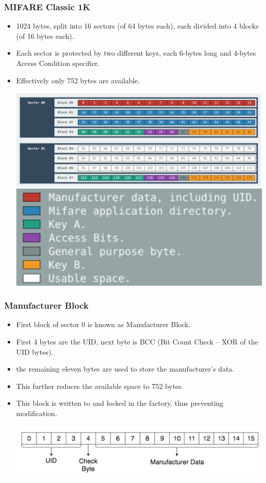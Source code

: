 \documentclass[12pt]{beamer}
\begin{document}
\begin{frame}
\frametitle{MIFARE Classic 1K}
\begin{itemize}
	\item 1024 bytes, split into 16 sectors (of 64 bytes each), each divided into 4 blocks (of 16 bytes each).
	\item Each sector is protected by two different keys, each 6-bytes long and 4-bytes Access Condition specifier.
	\item Effectively only 752 bytes are available.
	\begin{center}
		\includegraphics[width=0.85\linewidth]{mfc-sectors} \includegraphics[width=0.35\linewidth]{mfc-sectors-legend}
	\end{center}
\end{itemize}
\end{frame}

\begin{frame}
\frametitle{Manufacturer Block}
\begin{itemize}
	\item First block of sector 0 is known as Manufacturer Block.
	\item First 4 bytes are the UID, next byte is BCC (Bit Count Check -- XOR of the UID bytes).
	\item the remaining eleven bytes are used to store the manufacturer's data.
	\item This further reduces the available space to 752 bytes.
	\item This block is written to and locked in the factory, thus preventing modification.
	\begin{center}
		\includegraphics[width=\linewidth]{manufacturer-block}
	\end{center}
\end{itemize}
\end{frame}
\end{document}

